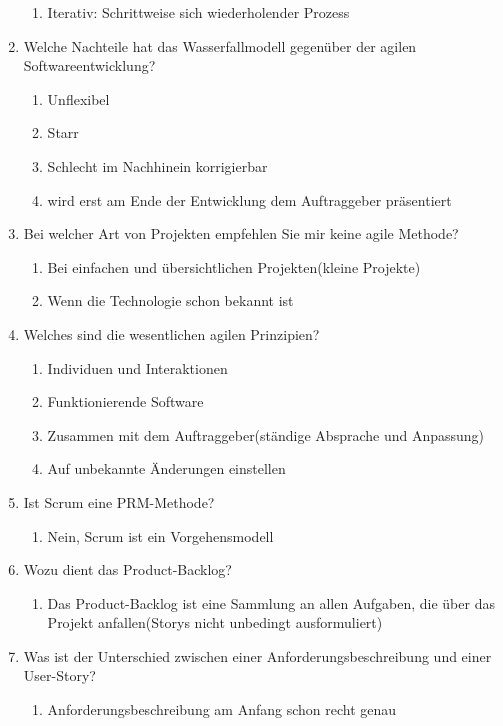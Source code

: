\documentclass[12pt,a4paper]{article}
\begin{document}
\begin{enumerate}
\begin{enumerate}
		\item Iterativ: Schrittweise sich wiederholender Prozess
	\end{enumerate}
	\item Welche Nachteile hat das Wasserfallmodell gegenüber der agilen Softwareentwicklung?
	\begin{enumerate}
		\item Unflexibel
		\item Starr 
		\item Schlecht im Nachhinein korrigierbar
		\item wird erst am Ende der Entwicklung dem Auftraggeber präsentiert
	\end{enumerate}
	\item Bei welcher Art von Projekten empfehlen Sie mir keine agile Methode?
	\begin{enumerate}
		\item Bei einfachen und übersichtlichen Projekten(kleine Projekte)
		\item Wenn die Technologie schon bekannt ist
	\end{enumerate}
	\item Welches sind die wesentlichen agilen Prinzipien?
	\begin{enumerate}
		\item Individuen und Interaktionen
		\item Funktionierende Software
		\item Zusammen mit dem Auftraggeber(ständige Absprache und Anpassung)
		\item Auf unbekannte Änderungen einstellen
	\end{enumerate}
	\item Ist Scrum eine PRM-Methode?
	\begin{enumerate}
		\item Nein, Scrum ist ein Vorgehensmodell
	\end{enumerate}
	\item Wozu dient das Product-Backlog?
	\begin{enumerate}
		\item Das Product-Backlog ist eine Sammlung an allen Aufgaben, die über das Projekt anfallen(Storys nicht unbedingt ausformuliert)
	\end{enumerate}
	\item Was ist der Unterschied zwischen einer Anforderungsbeschreibung und einer User-Story?
	\begin{enumerate}
		\item Anforderungsbeschreibung am Anfang schon recht genau

\end{enumerate}
\end{enumerate}
\end{document}
